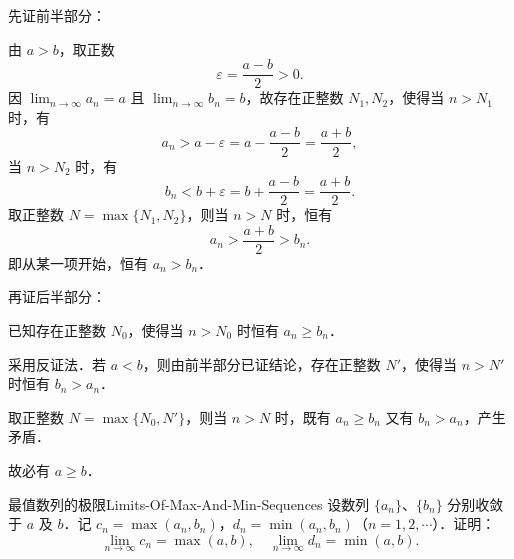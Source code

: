 \begin{myproof}
    先证前半部分：

    由 $a > b$，取正数
    \begin{equation}
        \varepsilon = \frac{a - b}{2} > 0.
    \end{equation}
    因 $\lim_{n\to\infty} a_n = a$ 且 $\lim_{n\to\infty} b_n = b$，故存在正整数 $N_1, N_2$，使得当 $n > N_1$ 时，有
    \begin{equation}
        a_n > a - \varepsilon = a - \frac{a - b}{2} = \frac{a + b}{2},
    \end{equation}
    当 $n > N_2$ 时，有
    \begin{equation}
        b_n < b + \varepsilon = b + \frac{a - b}{2} = \frac{a + b}{2}.
    \end{equation}
    取正整数 $N = \max\{N_1, N_2\}$，则当 $n > N$ 时，恒有
    \begin{equation}
        a_n > \frac{a + b}{2} > b_n.
    \end{equation}
    即从某一项开始，恒有 $a_n > b_n$．

    再证后半部分：

    已知存在正整数 $N_0$，使得当 $n > N_0$ 时恒有 $a_n \geqslant b_n$．

    采用反证法．若 $a < b$，则由前半部分已证结论，存在正整数 $N'$，使得当 $n > N'$ 时恒有 $b_n > a_n$．

    取正整数 $N = \max\{N_0, N'\}$，则当 $n > N$ 时，既有 $a_n \geqslant b_n$ 又有 $b_n > a_n$，产生矛盾．

    故必有 $a \geqslant b$．
\end{myproof}

\begin{problem}{最值数列的极限}{Limits-Of-Max-And-Min-Sequences}
    设数列 $\{a_n\}$、$\{b_n\}$ 分别收敛于 $a$ 及 $b$．记 $c_n = \max(a_n, b_n)$，$d_n = \min(a_n, b_n)$（$n = 1, 2, \cdots$）．证明：
    \begin{equation}
        \lim_{n\to\infty} c_n = \max(a, b), \quad \lim_{n\to\infty} d_n = \min(a, b).
    \end{equation}
\end{problem}

